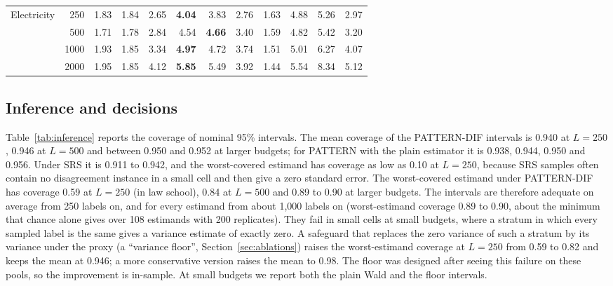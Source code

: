 \documentclass[pdflatex,sn-mathphys-num,iicol]{sn-jnl}
\theoremstyle{thmstyleone}
\theoremstyle{thmstyletwo}
\theoremstyle{thmstylethree}
\begin{document}
\begin{table}[p]
{\begin{tabular}{lrrrrrrrr rrr}
\addlinespace
Electricity & 250 & 1.83 & 1.84 & 2.65 & \textbf{4.04} & 3.83 & 2.76 & 1.63 & 4.88 & 5.26 & 2.97 \\
 & 500 & 1.71 & 1.78 & 2.84 & 4.54 & \textbf{4.66} & 3.40 & 1.59 & 4.82 & 5.42 & 3.20 \\
 & 1000 & 1.93 & 1.85 & 3.34 & \textbf{4.97} & 4.72 & 3.74 & 1.51 & 5.01 & 6.27 & 4.07 \\
 & 2000 & 1.95 & 1.85 & 4.12 & \textbf{5.85} & 5.49 & 3.92 & 1.44 & 5.54 & 8.34 & 5.12 \\
\bottomrule\end{tabular}
}
\end{table}

\subsection{Inference and decisions}
Table~\ref{tab:inference} reports the coverage of nominal 95\% intervals. The mean coverage of the PATTERN-DIF intervals is 0.940 at $L=250$, 0.946 at $L=500$ and between 0.950 and 0.952 at larger budgets; for PATTERN with the plain estimator it is 0.938, 0.944, 0.950 and 0.956. Under SRS it is 0.911 to 0.942, and the worst-covered estimand has coverage as low as 0.10 at $L=250$, because SRS samples often contain no disagreement instance in a small cell and then give a zero standard error. The worst-covered estimand under PATTERN-DIF has coverage 0.59 at $L=250$ (in law school), 0.84 at $L=500$ and 0.89 to 0.90 at larger budgets. The intervals are therefore adequate on average from 250 labels on, and for every estimand from about 1,000 labels on (worst-estimand coverage 0.89 to 0.90, about the minimum that chance alone gives over 108 estimands with 200 replicates). They fail in small cells at small budgets, where a stratum in which every sampled label is the same gives a variance estimate of exactly zero. A safeguard that replaces the zero variance of such a stratum by its variance under the proxy (a ``variance floor'', Section~\ref{sec:ablations}) raises the worst-estimand coverage at $L=250$ from 0.59 to 0.82 and keeps the mean at 0.946; a more conservative version raises the mean to 0.98. The floor was designed after seeing this failure on these pools, so the improvement is in-sample. At small budgets we report both the plain Wald and the floor intervals.
\end{document}
